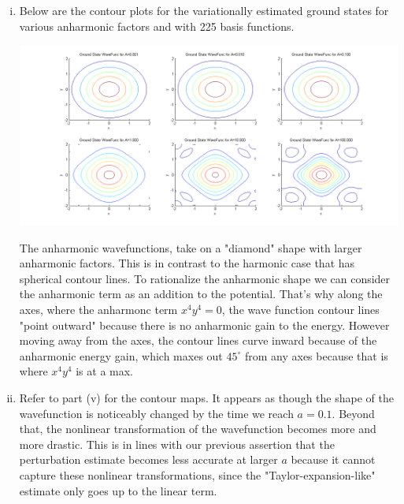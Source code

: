 \documentclass{article}
\begin{document}
\begin{enumerate}[i)]
  \item Below are the contour plots for the variationally estimated ground states for various anharmonic factors and with 225 basis functions.
    \begin{center}
      \includegraphics[scale=0.5]{prob1part5}
    \end{center}

      The anharmonic wavefunctions, take on a "diamond" shape with larger anharmonic factors. This is in contrast to the harmonic case that has spherical contour lines. To rationalize the anharmonic shape we can consider the anharmonic term as an addition to the potential. That's why along the axes, where the anharmonc term $x^4y^4 = 0$, the wave function contour lines "point outward" because there is no anharmonic gain to the energy. However moving away from the axes, the contour lines curve inward because of the anharmonic energy gain, which maxes out $45^{\circ}$ from any axes because that is where $x^4y^4$ is at a max.

    \item Refer to part (v) for the contour maps. It appears as though the shape of the wavefunction is noticeably changed by the time we reach $a = 0.1$. Beyond that, the nonlinear transformation of the wavefunction becomes more and more drastic. This is in lines with our previous assertion that the perturbation estimate becomes less accurate at larger $a$ because it cannot capture these nonlinear transformations, since the "Taylor-expansion-like" estimate only goes up to the linear term.

\end{enumerate}
\end{document}
